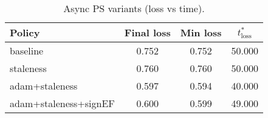 \begin{table}[t]
\centering
\begin{tabular}{lccc}
\toprule
Policy & Final loss & Min loss & $t^*_{\text{loss}}$ \\
\midrule
baseline & 0.752 & 0.752 & 50.000 \\
staleness & 0.760 & 0.760 & 50.000 \\
adam+staleness & 0.597 & 0.594 & 40.000 \\
adam+staleness+signEF & 0.600 & 0.599 & 49.000 \\
\bottomrule
\end{tabular}
\caption{Async PS variants (loss vs time).}
\label{tab:async}
\end{table}